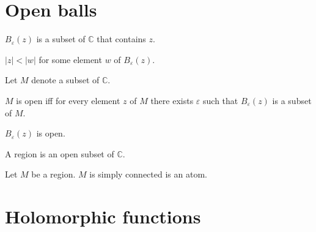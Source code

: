 \documentclass{article}
\newcommand{\Ball}[2]{B_{#1}(#2)}
\begin{document}
\section{Open balls}

\begin{forthel}
\begin{signature}
  $\Ball{\varepsilon}{z}$ is a subset of $\mathbb{C}$ that contains $z$.
\end{signature}

\begin{axiom}
  $|z| < |w|$ for some element $w$ of $\Ball{\varepsilon}{z}$.
\end{axiom}

Let $M$ denote a subset of $\mathbb{C}$.

\begin{definition}
  $M$ is open iff for every element $z$ of $M$ there exists $\varepsilon$ such that
  $\Ball{\varepsilon}{z}$ is a subset of $M$.
\end{definition}

\begin{axiom}
  $\Ball{\varepsilon}{z}$ is open.
\end{axiom}

\begin{signature}
  A region is an open subset of $\mathbb{C}$.
\end{signature}

\begin{signature}
  Let $M$ be a region.
  $M$ is simply connected is an atom.
\end{signature}
\end{forthel}


\section{Holomorphic functions}
\end{document}
